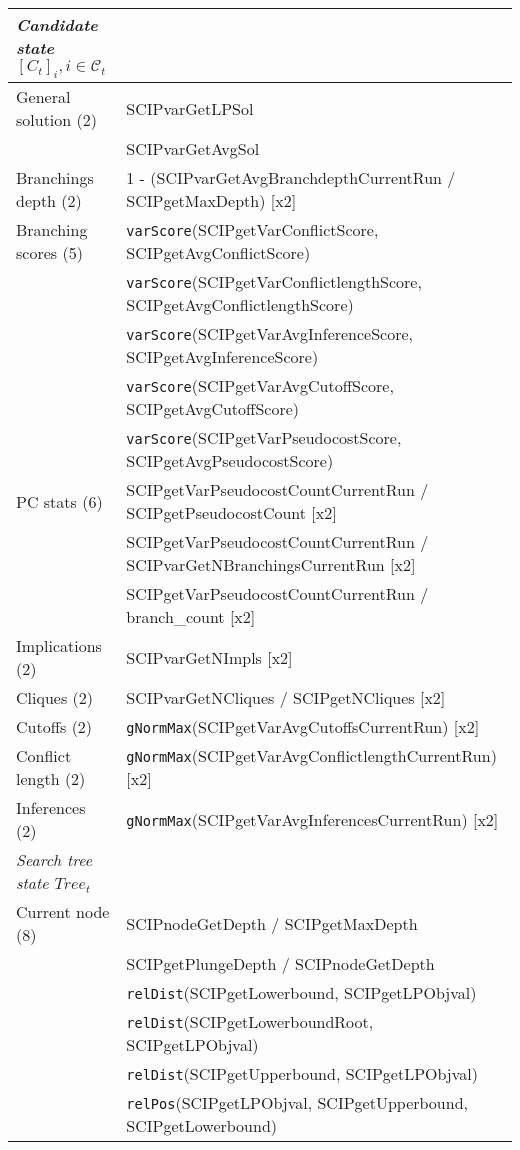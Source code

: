 \documentclass[letterpaper]{article} %
\begin{document}
\begin{center}
\begin{footnotesize}
\begin{longtable}{ll}
\emph{Candidate state $[C_t]_i, i\in\mathcal{C}_t$} & \\
\midrule
General solution (2) & SCIPvarGetLPSol \\
& SCIPvarGetAvgSol \\
Branchings depth (2) & 1 - (SCIPvarGetAvgBranchdepthCurrentRun / SCIPgetMaxDepth) [x2]\\
Branching scores (5) & \texttt{varScore}(SCIPgetVarConflictScore, SCIPgetAvgConflictScore) \\
& \texttt{varScore}(SCIPgetVarConflictlengthScore, SCIPgetAvgConflictlengthScore)\\
& \texttt{varScore}(SCIPgetVarAvgInferenceScore, SCIPgetAvgInferenceScore) \\
& \texttt{varScore}(SCIPgetVarAvgCutoffScore, SCIPgetAvgCutoffScore)\\
& \texttt{varScore}(SCIPgetVarPseudocostScore, SCIPgetAvgPseudocostScore)\\
PC stats (6) & SCIPgetVarPseudocostCountCurrentRun / SCIPgetPseudocostCount [x2]\\
& SCIPgetVarPseudocostCountCurrentRun / SCIPvarGetNBranchingsCurrentRun [x2]\\
& SCIPgetVarPseudocostCountCurrentRun / branch\_count [x2]\\
Implications (2) & SCIPvarGetNImpls [x2] \\
Cliques (2) & SCIPvarGetNCliques / SCIPgetNCliques [x2]\\
Cutoffs (2) & \texttt{gNormMax}(SCIPgetVarAvgCutoffsCurrentRun) [x2]\\
Conflict length (2) & \texttt{gNormMax}(SCIPgetVarAvgConflictlengthCurrentRun) [x2]\\
Inferences (2) & \texttt{gNormMax}(SCIPgetVarAvgInferencesCurrentRun) [x2]\\
\midrule
\emph{Search tree state $\mathit{Tree}_t$} & \\
\midrule
Current node (8) & SCIPnodeGetDepth / SCIPgetMaxDepth\\
& SCIPgetPlungeDepth / SCIPnodeGetDepth\\
& \texttt{relDist}(SCIPgetLowerbound, SCIPgetLPObjval)\\
& \texttt{relDist}(SCIPgetLowerboundRoot, SCIPgetLPObjval)\\
& \texttt{relDist}(SCIPgetUpperbound, SCIPgetLPObjval)\\
& \texttt{relPos}(SCIPgetLPObjval, SCIPgetUpperbound, SCIPgetLowerbound)\\

\end{longtable}
\end{footnotesize}
\end{center}
\end{document}
